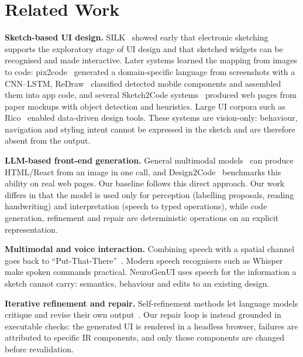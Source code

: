 \section{Related Work}
\textbf{Sketch-based UI design.} SILK~\cite{landay1995silk} showed early that electronic sketching supports the exploratory stage of UI design and that sketched widgets can be recognised and made interactive. Later systems learned the mapping from images to code: pix2code~\cite{beltramelli2018pix2code} generated a domain-specific language from screenshots with a CNN--LSTM, ReDraw~\cite{moran2020redraw} classified detected mobile components and assembled them into app code, and several Sketch2Code systems~\cite{robinson2019sketch2code,jain2019sketch2code} produced web pages from paper mockups with object detection and heuristics. Large UI corpora such as Rico~\cite{deka2017rico} enabled data-driven design tools. These systems are vision-only: behaviour, navigation and styling intent cannot be expressed in the sketch and are therefore absent from the output.

\textbf{LLM-based front-end generation.} General multimodal models~\cite{openai2023gpt4} can produce HTML/React from an image in one call, and Design2Code~\cite{si2024design2code} benchmarks this ability on real web pages. Our baseline follows this direct approach. Our work differs in that the model is used only for perception (labelling proposals, reading handwriting) and interpretation (speech to typed operations), while code generation, refinement and repair are deterministic operations on an explicit representation.

\textbf{Multimodal and voice interaction.} Combining speech with a spatial channel goes back to ``Put-That-There''~\cite{bolt1980put}. Modern speech recognisers such as Whisper~\cite{radford2023whisper} make spoken commands practical. NeuroGenUI uses speech for the information a sketch cannot carry: semantics, behaviour and edits to an existing design.

\textbf{Iterative refinement and repair.} Self-refinement methods let language models critique and revise their own output~\cite{madaan2023selfrefine}. Our repair loop is instead grounded in executable checks: the generated UI is rendered in a headless browser, failures are attributed to specific IR components, and only those components are changed before revalidation.

